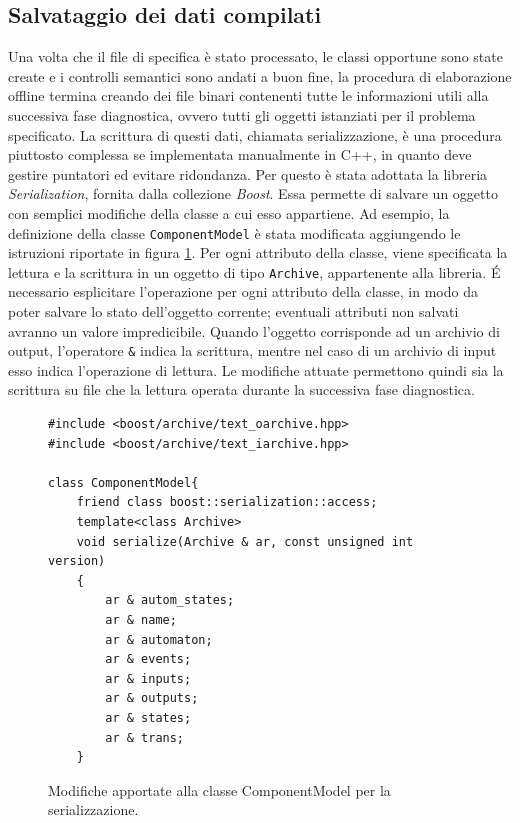 \subsection{Salvataggio dei dati compilati}
Una volta che il file di specifica è stato processato, le classi opportune sono state create e i controlli semantici sono andati a buon fine, la procedura di elaborazione offline termina creando dei file binari contenenti tutte le informazioni utili alla successiva fase diagnostica, ovvero tutti gli oggetti istanziati per il problema specificato. La scrittura di questi dati, chiamata serializzazione, è una procedura piuttosto complessa se implementata manualmente in C++, in quanto deve gestire puntatori ed evitare ridondanza. Per questo è stata adottata la libreria \emph{Serialization}, fornita dalla collezione \emph{Boost}\cite{web:boost}. Essa permette di salvare un oggetto con semplici modifiche della classe a cui esso appartiene.
Ad esempio, la definizione della classe \verb|ComponentModel| è stata modificata aggiungendo le istruzioni riportate in figura \ref{code:serialize}. Per ogni attributo della classe, viene specificata la lettura e la scrittura in un oggetto di tipo \verb|Archive|, appartenente alla libreria. \'E necessario esplicitare l'operazione per ogni attributo della classe, in modo da poter salvare lo stato dell'oggetto corrente; eventuali attributi non salvati avranno un valore impredicibile. Quando l'oggetto corrisponde ad un archivio di output, l'operatore \verb|&| indica la scrittura, mentre nel caso di un archivio di input esso indica l'operazione di lettura. Le modifiche attuate permettono quindi sia la scrittura su file che la lettura operata durante la successiva fase diagnostica.

\begin{figure}[htbp]
\begin{verbatim}
#include <boost/archive/text_oarchive.hpp>
#include <boost/archive/text_iarchive.hpp>

class ComponentModel{
    friend class boost::serialization::access;
    template<class Archive>
    void serialize(Archive & ar, const unsigned int version)
    {
        ar & autom_states;
        ar & name;
        ar & automaton;
        ar & events;
        ar & inputs;
        ar & outputs;
        ar & states;
        ar & trans;
    }
\end{verbatim}
\caption{Modifiche apportate alla classe ComponentModel per la serializzazione.}
\label{code:serialize}
\end{figure}

